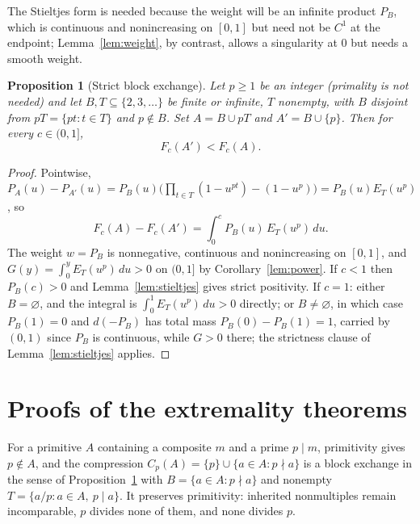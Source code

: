 \documentclass[11pt]{article}
\newtheorem{proposition}[theorem]{Proposition}
\theoremstyle{remark}
\begin{document}
The Stieltjes form is needed because the weight will be an infinite
product $P_B$, which is continuous and nonincreasing on $[0,1]$ but need
not be $C^1$ at the endpoint; Lemma~\ref{lem:weight}, by contrast,
allows a singularity at $0$ but needs a smooth weight.

\begin{proposition}[Strict block exchange]\label{prop:block}
Let $p\ge1$ be an integer (primality is not needed) and let
$B,T\subseteq\{2,3,\dots\}$ be finite or
infinite, $T$ nonempty, with $B$ disjoint from $pT=\{pt:t\in T\}$ and
$p\notin B$. Set $A=B\cup pT$ and $A'=B\cup\{p\}$. Then for every
$c\in(0,1]$,
\[
  F_c(A')<F_c(A).
\]
\end{proposition}

\begin{proof}
Pointwise,
$P_A(u)-P_{A'}(u)=P_B(u)\bigl(\prod_{t\in T}(1-u^{pt})-(1-u^p)\bigr)
=P_B(u)E_T(u^p)$, so
\[
  F_c(A)-F_c(A')=\int_0^cP_B(u)\,E_T(u^p)\,du .
\]
The weight $w=P_B$ is nonnegative, continuous and nonincreasing on
$[0,1]$, and $G(y)=\int_0^yE_T(u^p)\,du>0$ on $(0,1]$ by
Corollary~\ref{lem:power}. If $c<1$ then $P_B(c)>0$ and
Lemma~\ref{lem:stieltjes} gives strict positivity. If $c=1$: either
$B=\varnothing$, and the integral is $\int_0^1E_T(u^p)\,du>0$ directly;
or $B\ne\varnothing$, in which case $P_B(1)=0$ and $d(-P_B)$ has total
mass $P_B(0)-P_B(1)=1$, carried by $(0,1)$ since $P_B$ is continuous,
while $G>0$ there; the strictness clause of Lemma~\ref{lem:stieltjes}
applies.
\end{proof}

\section{Proofs of the extremality theorems}\label{sec:proofs}

For a primitive $A$ containing a composite $m$ and a prime $p\mid m$,
primitivity gives $p\notin A$, and the compression
$C_p(A)=\{p\}\cup\{a\in A:p\nmid a\}$ is a block exchange in the sense
of Proposition~\ref{prop:block} with $B=\{a\in A:p\nmid a\}$ and
nonempty $T=\{a/p:a\in A,\ p\mid a\}$. It preserves primitivity:
inherited nonmultiples remain incomparable, $p$ divides none of them,
and none divides $p$.
\end{document}
